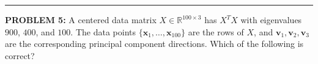 \documentclass[12pt]{amsart}
\newcommand{\divider}{
  \vspace{-1em} %
  \noindent
  \raisebox{-0.15ex}{\textbullet}%
  \hspace{0.5em}%
  \rule[0.5ex]{0.95\textwidth}{1.0pt}%
  \hspace{0.5em}%
  \raisebox{-0.15ex}{\textbullet}%
  \vspace{0em} %
}
\begin{document}
\divider

{\bf PROBLEM 5:}
A centered data matrix $X \in \mathbb{R}^{100 \times 3}$ has $X^TX$ with eigenvalues 
$900$, $400$, and $100$. The data points $\{\mathbf{x}_1, \ldots, \mathbf{x}_{100}\}$ are 
the rows of $X$, and $\mathbf{v}_1, \mathbf{v}_2, \mathbf{v}_3$ are the corresponding 
principal component directions.
% 
Which of the following is correct?
\end{document}

